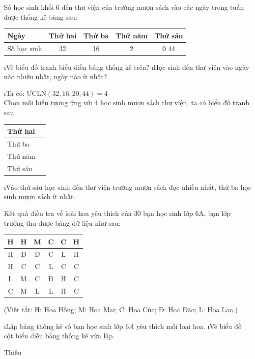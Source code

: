 \begin{bt}
	Số học sinh khối 6 đến thư viện của trường mượn sách vào các ngày trong tuần được thống kê bảng sau:
	\begin{center}
		\begin{tabular}{|l|c|c|c|c|}
			\hline
			Ngày&	Thứ hai&	Thứ ba&	Thứ năm&	Thứ sáu\\
			\hline
			Số học sinh&	32	&16&	2&0	44\\
			\hline
		\end{tabular}
	\end{center}
	\begin{enumerate}[a),leftmargin=*]
		\i Vẽ biểu đồ tranh biểu diễn bảng thống kê trên?
		\i Học sinh đến thư viện vào ngày nào nhiều nhất, ngày nào ít nhất?
	\end{enumerate}
	\begin{loigiaichuong40}
		\begin{enumerate}[a),leftmargin=*]
			\i Ta có: ${\text{ƯCLN}}(32,16,20,44) = 4$\\
			Chọn mỗi biểu tượng  ứng với 4 học sinh mượn sách thư viện, ta có biểu đồ tranh sau
			\begin{center}
				\begin{tabular}{|l|l|}
					\hline
					Thứ hai&	\\
					\hline
					Thứ ba	&	\\
					\hline
					Thứ năm&	\\
					\hline 
					Thứ sáu	&	\\
					\hline
				\end{tabular}
			\end{center}
			\i Vào thứ sáu học sinh đến thư viện trường mượn sách đọc nhiều nhất, thứ ba học sinh mượn sách ít nhất.
			
		\end{enumerate}
	\end{loigiaichuong40}
\end{bt}
\begin{bt}
	Kết quả điều tra về loài hoa yêu thích của 30 bạn học sinh lớp 6A, bạn lớp trưởng thu được bảng dữ liệu như sau:
	\begin{center}
		\begin{tabular}{|c|c|c|c|c|c|}
			\hline
			H&	H&	M&	C&	C&	H\\
			\hline
			H&	Đ&	Đ&	C&	L&	H\\
			\hline
			H&	C&	C&	L&	C&	C\\
			\hline
			L&	M&	C&	Đ&	H&	C\\
			\hline
			C&	M&	L&	L&	H&	C\\
			\hline
		\end{tabular}
	
	\vspace*{5pt}
	(Viết tắt: H: Hoa Hồng; M: Hoa Mai; C: Hoa Cúc; Đ: Hoa Đào; L: Hoa Lan.)
	\end{center}
	\begin{enumerate}[a),leftmargin=*]
		\i Lập bảng thống kê số bạn học sinh lớp $6A$ yêu thích mỗi loại hoa. 
		\i Vẽ biểu đồ cột biểu diễn bảng thống kê vừa lập.
	\end{enumerate}
	\begin{loigiaichuong40}
		Thiếu
	\end{loigiaichuong40}
\end{bt}
